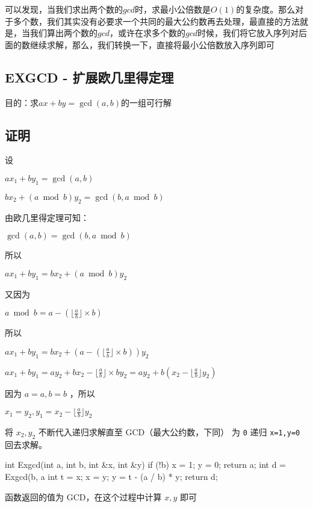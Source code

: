可以发现，当我们求出两个数的$gcd$时，求最小公倍数是$O(1)$的复杂度。那么对于多个数，我们其实没有必要求一个共同的最大公约数再去处理，最直接的方法就是，当我们算出两个数的$gcd$，或许在求多个数的$gcd$时候，我们将它放入序列对后面的数继续求解，那么，我们转换一下，直接将最小公倍数放入序列即可

\subsection{EXGCD - 扩展欧几里得定理}

目的：求$ax+by=\gcd(a,b)$的一组可行解

\subsection{证明}

设

$ax_1+by_1=\gcd(a,b)$

$bx_2+(a\bmod b)y_2=\gcd(b,a\bmod b)$

由欧几里得定理可知：

$\gcd(a,b)=\gcd(b,a\bmod b)$

所以

$ax_1+by_1=bx_2+(a\bmod b)y_2$

又因为

$a\bmod b=a-(\lfloor\frac{a}{b}\rfloor\times b)$

所以

$ax_1+by_1=bx_2+(a-(\lfloor\frac{a}{b}\rfloor\times b))y_2$

$ax_1+by_1=ay_2+bx_2-\lfloor\frac{a}{b}\rfloor\times by_2=ay_2+b(x_2-\lfloor\frac{a}{b}\rfloor y_2)$

因为 $a=a,b=b$ ，所以

$x_1=y_2,y_1=x_2-\lfloor\frac{a}{b}\rfloor y_2$ 

将 $x_2,y_2$ 不断代入递归求解直至 GCD（最大公约数，下同） 为 \texttt{0} 递归 \texttt{x=1,y=0} 回去求解。

\begin{cppcode}
int Exgcd(int a, int b, int &x, int &y) {
  if (!b) {
    x = 1;
    y = 0;
    return a;
  }
  int d = Exgcd(b, a %
  int t = x;
  x = y;
  y = t - (a / b) * y;
  return d;
}
\end{cppcode}

函数返回的值为 GCD，在这个过程中计算 $x,y$ 即可
